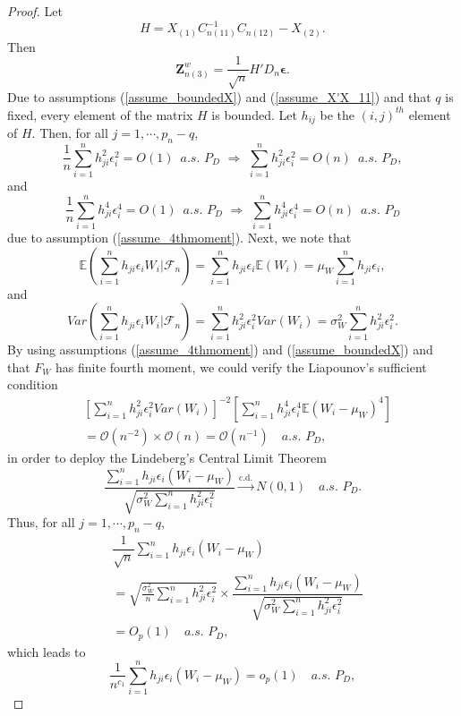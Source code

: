 \documentclass[ejs,authoryear,linksfromyear]{imsart}
\newcommand{\sumin}{\sum_{i=1}^n} %
\newcommand{\CONV}[1]{\stackrel{\text{#1}}{\longrightarrow}} %
\newcommand{\znwc}{\bm{Z}_{n(3)}^w}
\numberwithin{equation}{section}
\theoremstyle{plain}
\begin{document}
\begin{proof}
	Let 
	$$
	H = X_{(1)} C_{n(11)}^{-1} C_{n(12)} - X_{(2)}.
	$$
	Then 
	$$
	\znwc = \dfrac{1}{\sqrt{n}} H' D_n \bm{\epsilon}.
	$$
	Due to assumptions (\ref{assume_boundedX}) and (\ref{assume_X'X_11}) and that $q$ is fixed, every element of the matrix $H$ is bounded. Let $h_{ij}$ be the $(i,j)^{th}$ element of $H$. Then, for all $j = 1, \cdots, p_n-q$,
	$$
	\dfrac{1}{n} \sumin h_{ji}^2 \epsilon_i^2 
	= O(1) \,\,\, a.s. \,\, P_D
	\,\, \Longrightarrow \,\,  
	\sumin h_{ji}^2 \epsilon_i^2 
	= O(n) \,\,\, a.s. \,\, P_D,
	$$ 
	and
	$$
	\dfrac{1}{n} \sumin h_{ji}^4 \epsilon_i^4 
	= O(1) \,\,\, a.s. \,\, P_D
	\,\, \Longrightarrow \,\, 
	\sumin h_{ji}^4 \epsilon_i^4  
	= O(n) \,\,\, a.s. \,\, P_D  
	$$
	due to assumption (\ref{assume_4thmoment}). Next, we note that
	$$
	\mathbb{E}
	\left(
	\sumin h_{ji} \epsilon_i W_i
	\bigg| \mathcal{F}_n
	\right)
	= \sumin h_{ji} \epsilon_i \mathbb{E} (W_i)
	= \mu_W \sumin h_{ji} \epsilon_i , 
	$$
	and
	$$
	Var
	\left(
	\sumin h_{ji} \epsilon_i W_i
	\bigg| \mathcal{F}_n
	\right)
	= \sumin h_{ji}^2 \epsilon_i^2 Var(W_i) 
	= \sigma^2_W \sumin h_{ji}^2 \epsilon_i^2.
	$$
	By using assumptions (\ref{assume_4thmoment}) and (\ref{assume_boundedX}) and that $F_W$ has finite fourth moment, we could verify the Liapounov's sufficient condition
	\begin{align*}
	&\left[ 
		\sumin h_{ji}^2 \epsilon_i^2 Var(W_i) 
	\right]^{-2}
	\left[
		\sumin h_{ji}^4 \epsilon_i^4 
		\mathbb{E} (W_i - \mu_W)^4
	\right] \\
	&= \mathcal{O} \left( n^{-2} \right) 
	\times
	\mathcal{O} \left( n \right) 
	= \mathcal{O} \left( n^{-1} \right)
	\quad a.s. \,\, P_D, 
	\end{align*}
	in order to deploy the Lindeberg's Central Limit Theorem
	$$
	\dfrac{\sumin h_{ji} \epsilon_i (W_i - \mu_W) }
	{ \sqrt{ \sigma^2_W \sumin h_{ji}^2 \epsilon_i^2 } }
	\CONV{c.d.} N \left( 0, 1 \right)
	\quad a.s. \,\, P_D.
	$$
	Thus, for all $j = 1, \cdots, p_n-q$,
	\begin{align*}
	&\dfrac{1}{\sqrt{n}} \sumin h_{ji} \epsilon_i (W_i - \mu_W) \\
	&= \sqrt{ \frac{\sigma^2_W}{n} \sumin h_{ji}^2 \epsilon_i^2 } \times 
	\dfrac{\sumin h_{ji} \epsilon_i (W_i - \mu_W) }
	{ \sqrt{ \sigma^2_W \sumin h_{ji}^2 \epsilon_i^2 } }\\
	&= O_p(1) \quad a.s. \,\, P_D, 
	\end{align*}
	which leads to 
	$$
	\dfrac{1}{n^{c_1}} \sumin h_{ji} \epsilon_i (W_i - \mu_W) 
	= o_p(1) \quad a.s. \,\, P_D,
$$
\end{proof}
\end{document}
